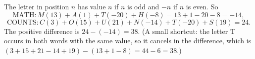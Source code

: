 The letter in position $n$ has value $n$ if $n$ is odd and $-n$ if $n$ is even. So
\[
\text{MATH}: M(13)+A(1)+T(-20)+H(-8)=13+1-20-8=-14,
\]
\[
\text{COUNTS}: C(3)+O(15)+U(21)+N(-14)+T(-20)+S(19)=24 .
\]
The positive difference is $24-(-14)=\boxed{38}$. (A small shortcut: the letter T occurs in both words with the same value, so it cancels in the difference, which is $(3+15+21-14+19)-(13+1-8)=44-6=38$.)
